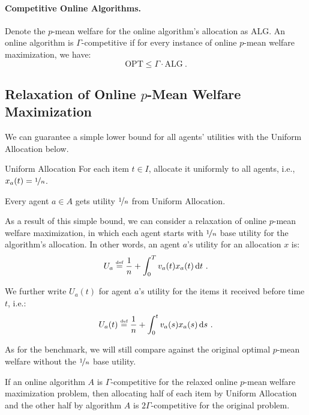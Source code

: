 \documentclass[11pt,letterpaper]{article}
\newcommand{\OPT}{\mathrm{OPT}}
\newcommand{\ALG}{\mathrm{ALG}}
\newcommand{\dif}[1]{\,\text{\rm d} #1}
\newcommand{\utility}{U}
\newcommand{\defeq}{\stackrel{\textrm{\tiny def}}{=}}
\begin{document}
\paragraph{Competitive Online Algorithms.}
Denote the $p$-mean welfare for the online algorithm's allocation as $\ALG$.
An online algorithm is $\Gamma$-competitive if for every instance of online $p$-mean welfare maximization, we have:
\[
	\OPT \le \Gamma \cdot \ALG
	~.
\]

\subsection[Relaxation of Online p-Mean Welfare Maximization]{Relaxation of Online $p$-Mean Welfare Maximization}


We can guarantee a simple lower bound for all agents' utilities with the Uniform Allocation below.

\begin{algorithm}{Uniform Allocation}
	For each item $t \in I$, allocate it uniformly to all agents, i.e., $x_a(t) = \nicefrac{1}{n}$.
\end{algorithm}

\begin{lemma}
    \label{lem:unif}
	Every agent $a \in A$ gets utility $\nicefrac{1}{n}$ from 	Uniform Allocation.
\end{lemma}

As a result of this simple bound, we can consider a relaxation of online $p$-mean welfare maximization, in which each agent starts with $\nicefrac{1}{n}$ base utility for the algorithm's allocation.
In other words, an agent $a$'s utility for an allocation $x$ is:
\[
	U_a \defeq \frac{1}{n} + \int_0^T v_a(t) x_a(t) \dif{t}
	~.
\]

We further write $\utility_a(t)$ for agent $a$'s utility for the items it received before time $t$, i.e.:
\[
	\utility_a(t) \defeq \frac{1}{n} + \int_0^t v_a(s) x_a(s) \dif{s}
	~.
\]

As for the benchmark, we will still compare against the original optimal $p$-mean welfare without the $\nicefrac{1}{n}$ base utility.

\begin{lemma}
	\label{lem:relaxation}
	If an online algorithm $A$ is $\Gamma$-competitive for the relaxed online $p$-mean welfare maximization problem, then allocating half of each item by Uniform Allocation and the other half by algorithm $A$ is $2 \Gamma$-competitive for the original problem.
\end{lemma}
\end{document}
